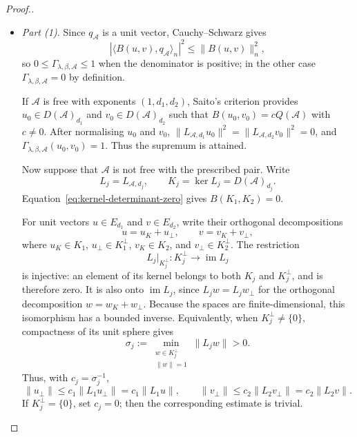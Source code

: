 \documentclass[10pt,a4paper]{amsart}
\begin{document}
\begin{proof}[Proof.]
\leavevmode\par\medskip
\begin{itemize}
\item \emph{Part (1).}
Since $q_{\mathcal{A}}$ is a unit vector, Cauchy--Schwarz gives
\[
|\langle B(u,v),q_{\mathcal{A}}\rangle_n|^2
\leq\|B(u,v)\|_n^2,
\]
so $0\leq\Gamma_{\lambda,\beta,\mathcal{A}}\leq1$ when the denominator is
 positive; in the other case $\Gamma_{\lambda,\beta, \mathcal{A}}=0$ by definition.

If $\mathcal{A}$ is free with exponents $(1,d_1,d_2)$, Saito's criterion provides $u_0\in D(\mathcal{A})_{d_1}$ and $v_0\in D(\mathcal{A})_{d_2}$ such that $B(u_0,v_0)=cQ({\mathcal{A}})$ with $c\neq0$. After normalising $u_0$ and $v_0$, $\|L_{\mathcal{A},d_1}u_0\|^2=\|L_{\mathcal{A},d_2}v_0\|^2=0$, and $\Gamma_{\lambda,\beta,\mathcal{A}}(u_0,v_0)=1$. Thus the supremum is attained.

Now suppose that $\mathcal{A}$ is not free with the prescribed pair. Write
\[
L_j=L_{\mathcal{A},d_j},
\qquad
K_j=\ker L_j=D(\mathcal{A})_{d_j}.
\]
Equation~\eqref{eq:kernel-determinant-zero} gives $B(K_1,K_2)=0$.

For unit vectors $u\in E_{d_1}$ and $v\in E_{d_2}$, write their orthogonal decompositions
\[
u=u_K+u_\perp,
\qquad
v=v_K+v_\perp,
\]
where $u_K\in K_1$, $u_\perp\in K_1^\perp$, $v_K\in K_2$, and $v_\perp\in K_2^\perp$. The restriction
\[
L_j|_{K_j^\perp}:K_j^\perp\longrightarrow \operatorname{im}L_j
\]
is injective: an element of its kernel belongs to both $K_j$ and $K_j^\perp$, and is therefore zero. It is also onto $\operatorname{im}L_j$, since $L_jw=L_jw_\perp$ for the orthogonal decomposition $w=w_K+w_\perp$. Because the spaces are finite-dimensional, this isomorphism has a bounded inverse. Equivalently, when $K_j^\perp\neq\{0\}$, compactness of its unit sphere gives
\[
\sigma_j:=
\min_{\substack{w\in K_j^\perp\\ \|w\|=1}}
\|L_jw\|>0.
\]
Thus, with $c_j=\sigma_j^{-1}$,
\[
\|u_\perp\|\leq c_1\|L_1u_\perp\|
   =c_1\|L_1u\|,
\qquad
\|v_\perp\|\leq c_2\|L_2v_\perp\|
   =c_2\|L_2v\|.
\]
If $K_j^\perp=\{0\}$, set $c_j=0$; then the corresponding estimate is trivial.


\end{itemize}
\end{proof}
\end{document}
